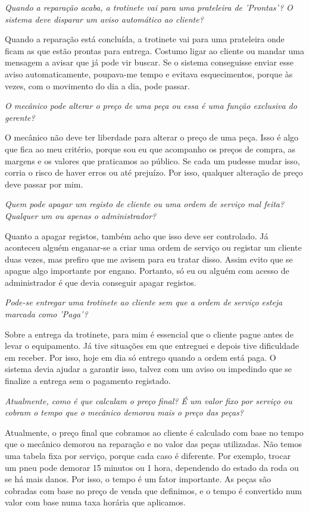 \documentclass[11pt,a4paper]{article}
\newcommand{\pergunta}[1]{\item[P:] \textit{#1}}
\newcommand{\resposta}[1]{\item[R:] #1}
\begin{document}
\begin{transcription}
		\pergunta{Quando a reparação acaba, a trotinete vai para uma prateleira de 'Prontas'? O sistema deve disparar um aviso automático ao cliente?}
		\resposta{Quando a reparação está concluída, a trotinete vai para uma prateleira onde ficam as que estão prontas para entrega. Costumo ligar ao cliente ou mandar uma mensagem a avisar que já pode vir buscar. Se o sistema conseguisse enviar esse aviso automaticamente, poupava-me tempo e evitava esquecimentos, porque às vezes, com o movimento do dia a dia, pode passar.}
		
		\pergunta{O mecânico pode alterar o preço de uma peça ou essa é uma função exclusiva do gerente?}
		\resposta{O mecânico não deve ter liberdade para alterar o preço de uma peça. Isso é algo que fica ao meu critério, porque sou eu que acompanho os preços de compra, as margens e os valores que praticamos ao público. Se cada um pudesse mudar isso, corria o risco de haver erros ou até prejuízo. Por isso, qualquer alteração de preço deve passar por mim.}
		
		\pergunta{Quem pode apagar um registo de cliente ou uma ordem de serviço mal feita? Qualquer um ou apenas o administrador?}
		\resposta{Quanto a apagar registos, também acho que isso deve ser controlado. Já aconteceu alguém enganar-se a criar uma ordem de serviço ou registar um cliente duas vezes, mas prefiro que me avisem para eu tratar disso. Assim evito que se apague algo importante por engano. Portanto, só eu ou alguém com acesso de administrador é que devia conseguir apagar registos.}
		
		\pergunta{Pode-se entregar uma trotinete ao cliente sem que a ordem de serviço esteja marcada como 'Paga'?}
		\resposta{Sobre a entrega da trotinete, para mim é essencial que o cliente pague antes de levar o equipamento. Já tive situações em que entreguei e depois tive dificuldade em receber. Por isso, hoje em dia só entrego quando a ordem está paga. O sistema devia ajudar a garantir isso, talvez com um aviso ou impedindo que se finalize a entrega sem o pagamento registado.}
		
		\pergunta{Atualmente, como é que calculam o preço final? É um valor fixo por serviço ou cobram o tempo que o mecânico demorou mais o preço das peças?}
		\resposta{Atualmente, o preço final que cobramos ao cliente é calculado com base no tempo que o mecânico demorou na reparação e no valor das peças utilizadas. Não temos uma tabela fixa por serviço, porque cada caso é diferente. Por exemplo, trocar um pneu pode demorar 15 minutos ou 1 hora, dependendo do estado da roda ou se há mais danos. Por isso, o tempo é um fator importante. As peças são cobradas com base no preço de venda que definimos, e o tempo é convertido num valor com base numa taxa horária que aplicamos.}
	

\end{transcription}
\end{document}
